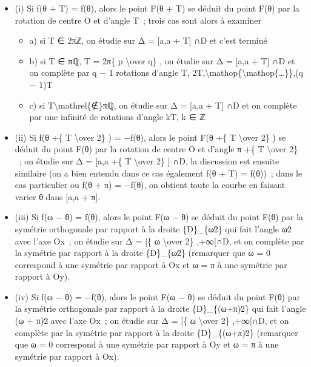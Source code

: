 \documentclass[]{article}
\begin{document}
\begin{itemize}
\itemsep1pt\parskip0pt
\item
  (i) Si f(θ + T) = f(θ), alors le point F(θ + T) se déduit du point
  F(θ) par la rotation de centre O et d'angle T~; trois cas sont alors à
  examiner

  \begin{itemize}
  \itemsep1pt\parskip0pt
  \item
    a) si T ∈ 2πℤ, on étudie sur Δ = {[}a,a + T{]} ∩D et c'est terminé
  \item
    b) si T ∈ πℚ, T = 2π\{ p \textbackslash{}over q\} , on étudie sur Δ
    = {[}a,a + T{]} ∩D et on complète par q − 1 rotations d'angle T,
    2T,\textbackslash{}mathop\{\textbackslash{}mathop\{\ldots{}\}\},(q −
    1)T
  \item
    c) si T\textbackslash{}mathrel\{∉\}πℚ, on étudie sur Δ = {[}a,a +
    T{]} ∩D et on complète par une infinité de rotations d'angle kT, k ∈
    ℤ
  \end{itemize}
\item
  (ii) Si f(θ +\{ T \textbackslash{}over 2\} ) = −f(θ), alors le point
  F(θ +\{ T \textbackslash{}over 2\} ) se déduit du point F(θ) par la
  rotation de centre O et d'angle π +\{ T \textbackslash{}over 2\} ~; on
  étudie sur Δ = {[}a,a +\{ T \textbackslash{}over 2\} {]} ∩D, la
  discussion est ensuite similaire (on a bien entendu dans ce cas
  également f(θ + T) = f(θ))~; dans le cas particulier ou f(θ + π) =
  −f(θ), on obtient toute la courbe en faisant varier θ dans {[}a,a +
  π{]}.
\item
  (iii) Si f(ω − θ) = f(θ), alors le point F(ω − θ) se déduit du point
  F(θ) par la symétrie orthogonale par rapport à la droite
  \{D\}\_\{ω∕2\} qui fait l'angle ω∕2 avec l'axe Ox~; on étudie sur Δ =
  {[}\{ ω \textbackslash{}over 2\} ,+∞{[}∩D, et on complète par la
  symétrie par rapport à la droite \{D\}\_\{ω∕2\} (remarquer que ω = 0
  correspond à une symétrie par rapport à Ox et ω = π à une symétrie par
  rapport à Oy).
\item
  (iv) Si f(ω − θ) = −f(θ), alors le point F(ω − θ) se déduit du point
  F(θ) par la symétrie orthogonale par rapport à la droite
  \{D\}\_\{(ω+π)∕2\} qui fait l'angle (ω + π)∕2 avec l'axe Ox~; on
  étudie sur Δ = {[}\{ ω \textbackslash{}over 2\} ,+∞{[}∩D, et on
  complète par la symétrie par rapport à la droite \{D\}\_\{(ω+π)∕2\}
  (remarquer que ω = 0 correspond à une symétrie par rapport à Oy et ω =
  π à une symétrie par rapport à Ox).
\end{itemize}
\end{document}
